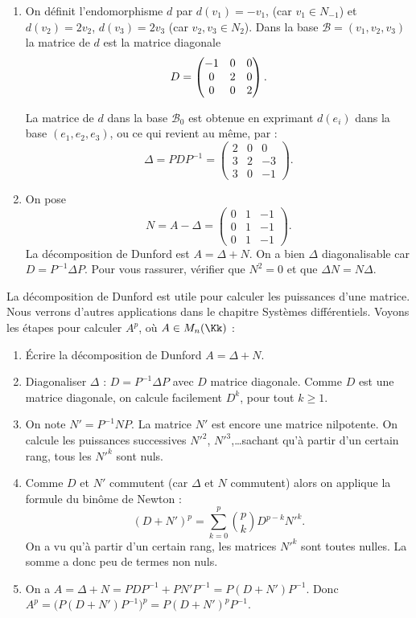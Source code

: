 \documentclass[12pt, class=report,crop=false]{standalone}
\begin{document}
\begin{exemple}
\begin{enumerate}
  
  \item  On définit l'endomorphisme $d$  par $d(v_1)=-v_1$, (car $v_1 \in N_{-1}$)
  et $d(v_2)= 2v_2$, $d(v_3) = 2v_3$ (car $v_2,v_3 \in N_2$).
  Dans la base $\mathcal{B} = (v_1,v_2,v_3)$ la matrice de $d$ est la matrice diagonale
  $$D = \begin{pmatrix}-1&0&0\cr 0&2&0\cr 0&0&2\end{pmatrix}.$$
  
  
  La matrice de $d$ dans la base $\mathcal{B}_0$ est
  obtenue en exprimant $d(e_i)$ dans la base $(e_1,e_2,e_3)$, ou ce qui revient au même, par : 
  $$\Delta = P D P^{-1} = \begin{pmatrix}2 & 0 & 0 \\3 & 2 & -3 \\3 & 0 & -1\end{pmatrix}.$$
  
  \item On pose 
  $$N = A - \Delta=\begin{pmatrix}  0 & 1 & -1 \\0 & 1 & -1 \\0 & 1 & -1\end{pmatrix}.$$
  La décomposition de Dunford est $A = \Delta + N$. 
  On a bien $\Delta$ diagonalisable car $D = P^{-1}\Delta P$. Pour vous rassurer, vérifier 
  que $N^2 = 0$ et que $\Delta N = N\Delta$. 
  \end{enumerate}
\end{exemple}

 
\bigskip


La décomposition de Dunford est utile pour calculer les puissances d'une matrice.
Nous verrons d'autres applications dans le chapitre \og{}Systèmes différentiels\fg{}.
Voyons les étapes pour calculer $A^p$, où  $A\in M_n(\Kk)$ :
\begin{enumerate}
  \item \'Ecrire la décomposition de Dunford $A = \Delta + N$.  
  
  \item Diagonaliser $\Delta$ : $D = P^{-1}\Delta P$ avec $D$ matrice diagonale.
  Comme $D$ est une matrice diagonale, on calcule facilement $D^k$, pour tout $k\ge1$.
  
  \item On note $N' = P^{-1}NP$. La matrice $N'$ est encore une matrice nilpotente. 
  On calcule les puissances successives $N'^2$, $N'^3$,\ldots sachant qu'à partir d'un certain 
  rang, tous les $N'^k$ sont nuls.
  
  \item Comme $D$ et $N'$ commutent (car $\Delta$ et $N$ commutent) alors 
  on applique la formule du binôme de Newton :
$$(D+N')^p=\sum_{k=0}^p \binom{p}{k} D^{p-k} N'^{k}.$$
On a vu qu'à partir d'un certain rang, les matrices $N'^k$ sont toutes nulles. La somme a donc peu de termes non nuls.

  \item On a $A = \Delta + N = P D P^{-1} + P N' P^{-1} = P(D+N')P^{-1}$.
  Donc $A^p = \big(P(D+N')P^{-1}\big)^p = P (D+N')^p P^{-1}$.
\end{enumerate}
\end{document}
